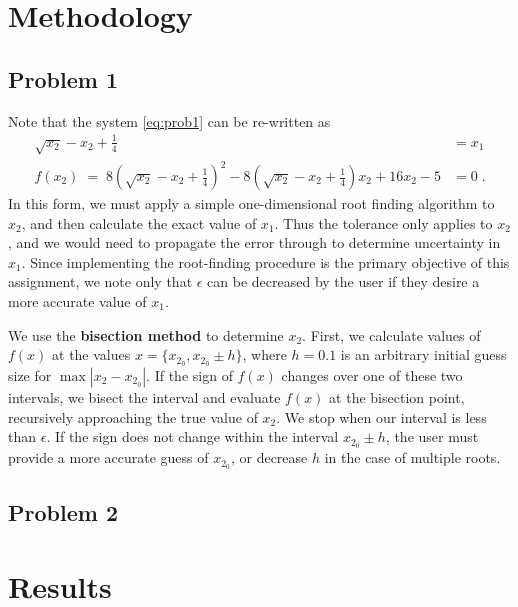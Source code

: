 \documentclass[12pt]{article}
\begin{document}
\section{Methodology} %

\subsection{Problem 1}

Note that the system \eqref{eq:prob1} can be re-written as
\begin{equation}
\begin{alignedat}{2}
\sqrt{x_2} - x_2 + \tfrac{1}{4} &= x_1 \\
f(x_2) \; = \; 8 \left( \sqrt{x_2} - x_2 + \tfrac{1}{4} \right)^2 - 8 \left( \sqrt{x_2} - x_2 + \tfrac{1}{4} \right) x_2 + 16 x_2 - 5  &= 0
\;.
\end{alignedat}
\label{eq:prob1rewrite}
\end{equation}
In this form, we must apply a simple one-dimensional root finding algorithm to $x_2$, and then calculate the exact value of $x_1$. Thus the tolerance only applies to $x_2$, and we would need to propagate the error through to determine uncertainty in $x_1$. Since implementing the root-finding procedure is the primary objective of this assignment, we note only that $\epsilon$ can be decreased by the user if they desire a more accurate value of $x_1$.

We use the \textbf{bisection method} to determine $x_2$. First, we calculate values of $f(x)$ at the values $x = \{ x_{2_0}, x_{2_0} \pm h \}$, where $h = 0.1$ is an arbitrary initial guess size for $\max |x_2 - x_{2_0}|$. If the sign of $f(x)$ changes over one of these two intervals, we bisect the interval and evaluate $f(x)$ at the bisection point, recursively approaching the true value of $x_2$. We stop when our interval is less than $\epsilon$. If the sign does not change within the interval $x_{2_0} \pm h$, the user must provide a more accurate guess of $x_{2_0}$, or decrease $h$ in the case of multiple roots.

\subsection{Problem 2}

\section{Results} %
\end{document}
